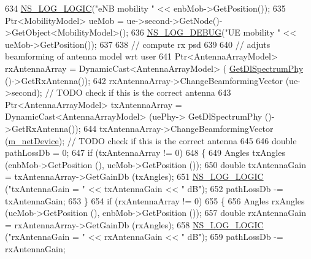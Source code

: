 \begin{DoxyCode}
634                 \hyperlink{group__logging_ga88acd260151caf2db9c0fc84997f45ce}{NS\_LOG\_LOGIC}(\textcolor{stringliteral}{"eNB mobility "} << enbMob->GetPosition());
635                 Ptr<MobilityModel> ueMob = ue->second->GetNode()->GetObject<MobilityModel>();
636                 \hyperlink{group__logging_ga413f1886406d49f59a6a0a89b77b4d0a}{NS\_LOG\_DEBUG}(\textcolor{stringliteral}{"UE mobility "} << ueMob->GetPosition());
637                 
638                 \textcolor{comment}{// compute rx psd}
639 
640                 \textcolor{comment}{// adjuts beamforming of antenna model wrt user}
641                 Ptr<AntennaArrayModel> rxAntennaArray = DynamicCast<AntennaArrayModel> (
      \hyperlink{classns3_1_1MmWaveEnbPhy_a1fd12ed3e1da54288cf17a1bb9bcdf74}{GetDlSpectrumPhy} ()->GetRxAntenna());
642                 rxAntennaArray->ChangeBeamformingVector (ue->second);                                                                   \textcolor{comment}{
      // TODO check if this is the correct antenna}
643                 Ptr<AntennaArrayModel> txAntennaArray = DynamicCast<AntennaArrayModel> (uePhy->
      GetDlSpectrumPhy ()->GetRxAntenna());
644                 txAntennaArray->ChangeBeamformingVector (\hyperlink{classns3_1_1MmWavePhy_a0f14f4e8f7539b06497ba321d9df344c}{m\_netDevice});                                                                       \textcolor{comment}{
      // TODO check if this is the correct antenna}
645 
646                 \textcolor{keywordtype}{double} pathLossDb = 0;
647                 \textcolor{keywordflow}{if} (txAntennaArray != 0)
648                 \{
649                   Angles txAngles (enbMob->GetPosition (), ueMob->GetPosition ());
650                   \textcolor{keywordtype}{double} txAntennaGain = txAntennaArray->GetGainDb (txAngles);
651                   \hyperlink{group__logging_ga88acd260151caf2db9c0fc84997f45ce}{NS\_LOG\_LOGIC} (\textcolor{stringliteral}{"txAntennaGain = "} << txAntennaGain << \textcolor{stringliteral}{" dB"});
652                   pathLossDb -= txAntennaGain;
653                 \}
654                 \textcolor{keywordflow}{if} (rxAntennaArray != 0)
655                 \{
656                   Angles rxAngles (ueMob->GetPosition (), enbMob->GetPosition ());
657                   \textcolor{keywordtype}{double} rxAntennaGain = rxAntennaArray->GetGainDb (rxAngles);
658                   \hyperlink{group__logging_ga88acd260151caf2db9c0fc84997f45ce}{NS\_LOG\_LOGIC} (\textcolor{stringliteral}{"rxAntennaGain = "} << rxAntennaGain << \textcolor{stringliteral}{" dB"});
659                   pathLossDb -= rxAntennaGain;

\end{DoxyCode}
